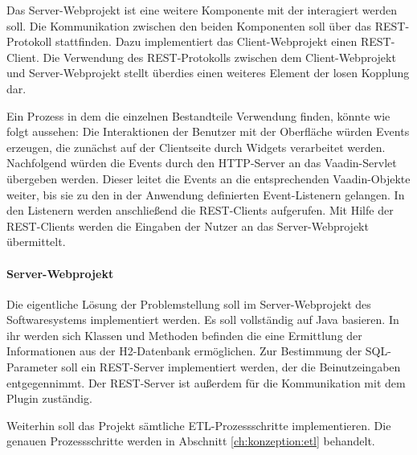 Das Server-Webprojekt ist eine weitere Komponente mit der interagiert werden soll. Die Kommunikation zwischen den beiden Komponenten soll über das REST-Protokoll stattfinden. Dazu implementiert das Client-Webprojekt einen REST-Client. Die Verwendung des REST-Protokolls zwischen dem Client-Webprojekt und Server-Webprojekt stellt überdies einen weiteres Element der losen Kopplung dar.

Ein Prozess in dem die einzelnen Bestandteile Verwendung finden, könnte wie folgt aussehen: Die Interaktionen der Benutzer mit der Oberfläche würden Events erzeugen, die zunächst auf der Clientseite durch Widgets verarbeitet werden. Nachfolgend würden die Events durch den HTTP-Server an das Vaadin-Servlet übergeben werden. Dieser leitet die Events an die entsprechenden Vaadin-Objekte weiter, bis sie zu den in der Anwendung definierten Event-Listenern gelangen. In den Listenern werden anschließend die REST-Clients aufgerufen. Mit Hilfe der REST-Clients werden die Eingaben der Nutzer an das Server-Webprojekt übermittelt. 

\paragraph{Server-Webprojekt}

Die eigentliche Lösung der Problemstellung soll im Server-Webprojekt des Softwaresystems implementiert werden. Es soll vollständig auf Java basieren. In ihr werden sich Klassen und Methoden befinden die eine Ermittlung der Informationen aus der H2-Datenbank ermöglichen. Zur Bestimmung der SQL-Parameter soll ein REST-Server implementiert werden, der die Beinutzeingaben entgegennimmt. Der REST-Server ist außerdem für die Kommunikation mit dem Plugin zuständig.

Weiterhin soll das Projekt sämtliche ETL-Prozessschritte implementieren. Die genauen Prozessschritte werden in Abschnitt \ref{ch:konzeption:etl} behandelt. 



